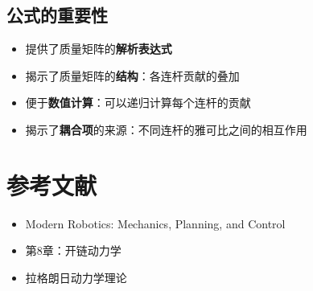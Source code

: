 \documentclass[12pt,a4paper]{article}
\begin{document}
\subsection{公式的重要性}

\begin{itemize}
\item 提供了质量矩阵的\textbf{解析表达式}
\item 揭示了质量矩阵的\textbf{结构}：各连杆贡献的叠加
\item 便于\textbf{数值计算}：可以递归计算每个连杆的贡献
\item 揭示了\textbf{耦合项}的来源：不同连杆的雅可比之间的相互作用
\end{itemize}

\section{参考文献}

\begin{itemize}
\item Modern Robotics: Mechanics, Planning, and Control
\item 第8章：开链动力学
\item 拉格朗日动力学理论
\end{itemize}
\end{document}
